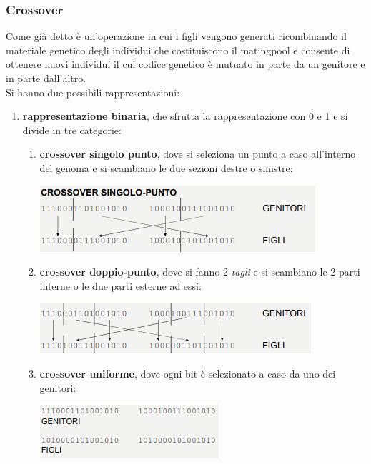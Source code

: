 \documentclass[a4paper,12pt, oneside]{book}
\begin{document}
\subsubsection{Crossover}
Come già detto è un'operazione in cui i figli vengono generati
ricombinando il materiale genetico degli individui che costituiscono
il matingpool e consente di ottenere nuovi individui il cui codice
genetico è mutuato in parte da un genitore e in parte dall'altro.\\
Si hanno due possibili rappresentazioni:
\begin{enumerate}
  \item \textbf{rappresentazione binaria}, che sfrutta la
  rappresentazione con 0 e 1 e si divide in tre categorie:
  \begin{enumerate}
    \item \textbf{crossover singolo punto}, dove si seleziona un punto
  a caso all’interno del genoma e si scambiano le due sezioni destre o
  sinistre:
    \begin{center}
      \includegraphics[scale = 0.7]{img/cr.png}
    \end{center}
    \item \textbf{crossover doppio-punto}, dove si fanno 2
    \textit{tagli} e si scambiano le 2 parti interne o le due parti
    esterne ad essi:
    \begin{center}
      \includegraphics[scale = 0.7]{img/cr2.png}
    \end{center}
    \item \textbf{crossover uniforme}, dove ogni bit è selezionato a
    caso da uno dei genitori:
    \begin{center}
      \includegraphics[scale = 0.7]{img/cr3.png}
    \end{center}

\end{enumerate}
\end{enumerate}
\end{document}
